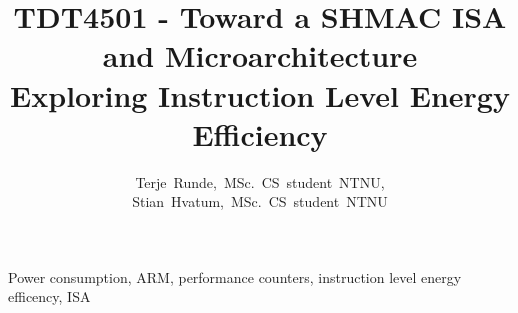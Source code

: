 \documentclass[journal]{IEEEtran}
\begin{document}
\title{\small{TDT4501 - Toward a SHMAC ISA and
Microarchitecture}\\\Huge{Exploring Instruction Level Energy Efficiency}}

\author{Terje~Runde,~MSc.~CS~student~NTNU,
        Stian~Hvatum,~MSc.~CS~student~NTNU}


\maketitle



\begin{IEEEkeywords}
Power consumption, ARM, performance counters, instruction level energy efficency, ISA
\end{IEEEkeywords}












\hfill
\newpage
\hfill
\newpage
\appendix

\end{document}
